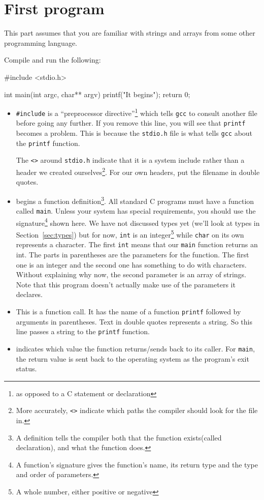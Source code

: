 
\chapter{First program}

\begin{knowledge}
This part assumes that you are familiar with strings and arrays from some other programming language.
\end{knowledge}

Compile and run the following:
\begin{codeblock}
#include <stdio.h>

int main(int argc, char** argv) {
    printf("It begins\n");
    return 0;
}
\end{codeblock}

\begin{itemize}
 \item[1] \lstinline!#include! is a ``preprocessor directive''\footnote{as opposed to a C statement or declaration} which tells \texttt{gcc} to 
 consult another file before going any further.  If you remove this line, you will see that \texttt{printf} becomes a problem.
 This is because the \texttt{stdio.h} file is what tells \texttt{gcc} about the \texttt{printf} function.
 
 The \texttt{<>} around \texttt{stdio.h} indicate that it is a system include rather than a header we created ourselves\footnote{
 More accurately, \texttt{<>} indicate which paths the compiler should look for the file in.}.
 For our own headers, put the filename in double quotes.
 
 \item[3] begins a function definition\footnote{A definition tells the compiler both that the function exists(called declaration), and what the function does.}.
 All standard C programs must have a function called \texttt{main}.
 Unless your system has special requirements, you should use the signature\footnote{A function's signature gives the function's name, its return type and the type and order of parameters.} shown here.
 We have not discussed types yet (we'll look at types in Section~\ref{sec:types}) but for now, \texttt{int} is an 
 integer\footnote{A whole number, either positive or negative} while \texttt{char} on its own represents a character.
 The first \texttt{int} means that our \texttt{main} function returns an int.
 The parts in parentheses are the parameters for the function.
 The first one is an integer and the second one has something to do with characters.
 Without explaining why now, the second parameter is an array of strings.
 Note that this program doesn't actually make use of the parameters it declares.
 
 \item[4] This is a function call. It has the name of a function \texttt{printf} followed by arguments in parentheses.
 Text in double quotes represents a string. 
 So this line passes a string to the \texttt{printf} function.
 
 \item[5] indicates which value the function returns/sends back to its caller.
 For \texttt{main}, the return value is sent back to the operating system as the program's exit status.
\end{itemize}

